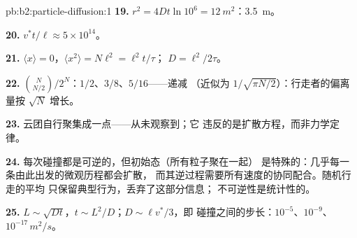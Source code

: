 \begin{solution}{pb:b2:particle-diffusion:1}
\textbf{19.} $r^2 = 4Dt\ln 10^6 = \qty{12}{m^2}$：\qty{3.5}{m}。

\textbf{20.} $v^*t/\ell \approx 5 \times 10^{14}$。

\textbf{21.} $\langle x\rangle = 0$，$\langle x^2\rangle = N\ell^2 = \ell^2 t/\tau$；
$D = \ell^2/2\tau$。

\textbf{22.} $\binom{N}{N/2}/2^N$：$1/2$、$3/8$、$5/16$——递减
（近似为 $1/\sqrt{\pi N/2}$）：行走者的偏离量按 $\sqrt N$ 增长。

\textbf{23.} 云团自行聚集成一点——从未观察到；它
违反的是扩散方程，而非力学定律。

\textbf{24.} 每次碰撞都是可逆的，但初始态（所有粒子聚在一起）
是特殊的：几乎每一条由此出发的微观历程都会扩散，
而其逆过程需要所有速度的协同配合。随机行走的平均
只保留典型行为，丢弃了这部分信息；
不可逆性是统计性的。

\textbf{25.} $L \sim \sqrt{Dt}$，$t \sim L^2/D$；$D \sim \ell v^*/3$，即
碰撞之间的步长：$10^{-5}$、$10^{-9}$、$10^{-17}\,\unit{m^2/s}$。
\end{solution}
